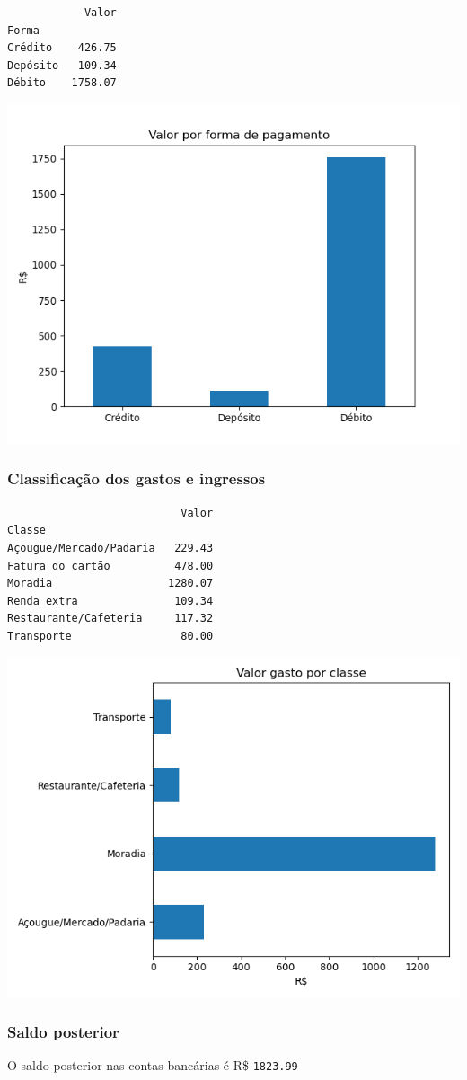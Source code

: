 \documentclass[11pt]{article}
\begin{document}
\begin{verbatim}
            Valor
Forma            
Crédito    426.75
Depósito   109.34
Débito    1758.07
\end{verbatim}


\begin{center}
\includegraphics[width=.9\linewidth]{outubro-forma.png}
\end{center}

\subsubsection{Classificação dos gastos e ingressos}
\label{sec:org3442298}

\begin{verbatim}
                           Valor
Classe                          
Açougue/Mercado/Padaria   229.43
Fatura do cartão          478.00
Moradia                  1280.07
Renda extra               109.34
Restaurante/Cafeteria     117.32
Transporte                 80.00
\end{verbatim}


\begin{center}
\includegraphics[width=.9\linewidth]{outubro-classe.png}
\end{center}

\subsubsection{Saldo posterior}
\label{sec:org91b37c8}

O saldo posterior nas contas bancárias é R\$ \texttt{1823.99}
\end{document}
